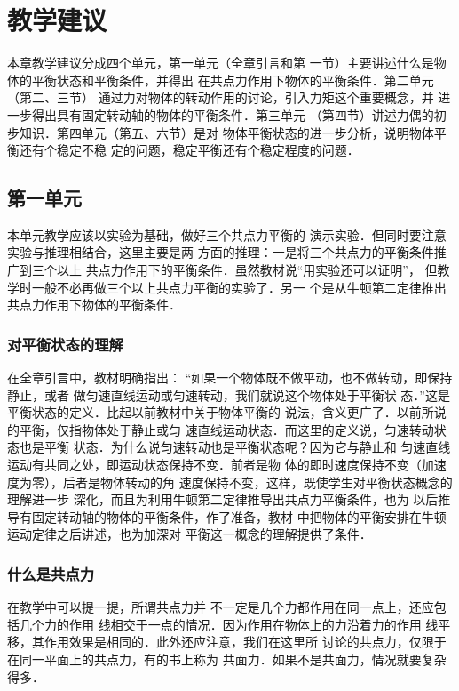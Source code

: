 \section{教学建议}
本章教学建议分成四个单元，第一单元（全章引言和第
一节）主要讲述什么是物体的平衡状态和平衡条件，并得出
在共点力作用下物体的平衡条件．第二单元（第二、三节）
通过力对物体的转动作用的讨论，引入力矩这个重要概念，并
进一步得出具有固定转动轴的物体的平衡条件．第三单元
（第四节）讲述力偶的初步知识．第四单元（第五、六节）是对
物体平衡状态的进一步分析，说明物体平衡还有个稳定不稳
定的问题，稳定平衡还有个稳定程度的问题．

\subsection{第一单元}
本单元教学应该以实验为基础，做好三个共点力平衡的
演示实验．但同时要注意实验与推理相结合，这里主要是两
方面的推理：一是将三个共点力的平衡条件推广到三个以上
共点力作用下的平衡条件．虽然教材说“用实验还可以证明”，
但教学时一般不必再做三个以上共点力平衡的实验了．另一
个是从牛顿第二定律推出共点力作用下物体的平衡条件．

\subsubsection{对平衡状态的理解}

在全章引言中，教材明确指出：
“如果一个物体既不做平动，也不做转动，即保持静止，或者
做匀速直线运动或匀速转动，我们就说这个物体处于平衡状
态．”这是平衡状态的定义．比起以前教材中关于物体平衡的
说法，含义更广了．以前所说的平衡，仅指物体处于静止或匀
速直线运动状态．而这里的定义说，匀速转动状态也是平衡
状态．为什么说匀速转动也是平衡状态呢？因为它与静止和
匀速直线运动有共同之处，即运动状态保持不变．前者是物
体的即时速度保持不变（加速度为零），后者是物体转动的角
速度保持不变，这样，既使学生对平衡状态概念的理解进一步
深化，而且为利用牛顿第二定律推导出共点力平衡条件，也为
以后推导有固定转动轴的物体的平衡条件，作了准备，教材
中把物体的平衡安排在牛顿运动定律之后讲述，也为加深对
平衡这一概念的理解提供了条件．

\subsubsection{什么是共点力}

在教学中可以提一提，所谓共点力并
不一定是几个力都作用在同一点上，还应包括几个力的作用
线相交于一点的情况．因为作用在物体上的力沿着力的作用
线平移，其作用效果是相同的．此外还应注意，我们在这里所
讨论的共点力，仅限于在同一平面上的共点力，有的书上称为
共面力．如果不是共面力，情况就要复杂得多．

